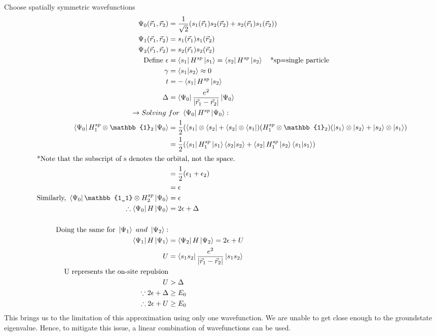 \documentclass{article}
\begin{document}
\begin{flushleft}
Choose spatially symmetric wavefunctions
\begin{align*}
    \Psi_0(\vec{r}_1,\vec{r}_2)&=\frac{1}{\sqrt{2}}(s_1(\vec{r}_1)s_2(\vec{r}_2)+s_2(\vec{r}_1)s_1(\vec{r}_2))\\
    \Psi_1(\vec{r}_1,\vec{r}_2)&=s_1(\vec{r}_1)s_1(\vec{r}_2)\\
    \Psi_2(\vec{r}_1,\vec{r}_2)&=s_2(\vec{r}_1)s_2(\vec{r}_2)\\
    \text{Define}\ \epsilon&=\bra{s_1}H^{sp}\ket{s_1}=\bra{s_2}H^{sp}\ket{s_2}\quad \text{*sp=single particle}\\
    \gamma&=\bra{s_1}\ket{s_2}\approx 0\\
    t&=-\bra{s_1}H^{sp}\ket{s_2}\\
    \Delta&=\bra{\Psi_0}\frac{e^2}{\abs{\vec{r}_1-\vec{r}_2}}\ket{\Psi_0}\\
    \rightarrow Solving\ &for\ \bra{\Psi_0}H^{sp}\ket{\Psi_0}:\\
    \bra{\Psi_0}H_1^{sp}\otimes\mathbb{1}_2\ket{\Psi_0}&=\frac{1}{2}(\bra{s_1}\otimes\bra{s_2}+\bra{s_2}\otimes\bra{s_1})(H_1^{sp}\otimes\mathbb{1}_2)(\ket{s_1}\otimes\ket{s_2}+\ket{s_2}\otimes\ket{s_1})\\
    &=\frac{1}{2}(\bra{s_1}H_1^{sp}\ket{s_1}\bra{s_2}\ket{s_2}+\bra{s_2}H_1^{sp}\ket{s_2}\bra{s_1}\ket{s_1})\\
    \intertext{*Note that the subscript of s denotes the orbital, not the space.}
    &=\frac{1}{2}(\epsilon_1+\epsilon_2)\\
    &=\epsilon\\
    \text{Similarly,}\ \bra{\Psi_0}\mathbb{1_1}\otimes H_2^{sp}\ket{\Psi_0}&=\epsilon\\
    \therefore \bra{\Psi_0}H\ket{\Psi_0}&=2\epsilon+\Delta\\
    \\
    \text{Doing the same for}\ \ket{\Psi_1}\ and\ \ket{\Psi_2}:\\
    \bra{\Psi_1}H\ket{\Psi_1}&=\bra{\Psi_2}H\ket{\Psi_2}=2\epsilon+U\\
    U&=\bra{s_1s_2}\frac{e^2}{\abs{\vec{r}_1-\vec{r}_2}}\ket{s_1s_2}\\
    \text{U represents the on-site repulsion}\\
    U&>\Delta\\
    \because 2\epsilon+\Delta &\geq E_0\\
    \therefore 2\epsilon+U &\geq E_0
    \end{align*}
This brings us to the limitation of this approximation using only one wavefunction. We are unable to get close enough to the groundstate eigenvalue. Hence, to mitigate this issue, a linear combination of wavefunctions can be used.
\pagebreak


\end{flushleft}
\end{document}
